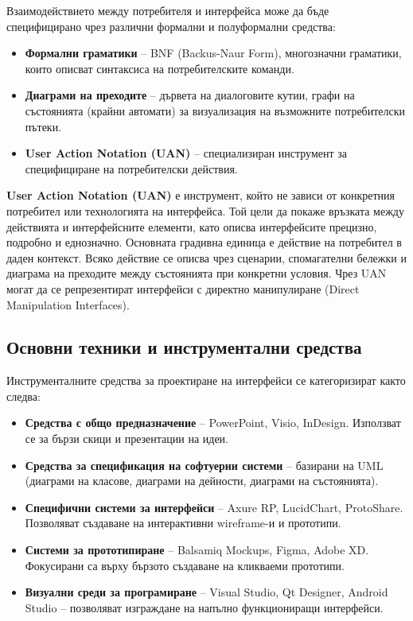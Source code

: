 \documentclass{scrartcl}
\begin{document}
\begin{FlushLeft}
Взаимодействието между потребителя и интерфейса може да бъде специфицирано чрез различни формални и полуформални средства:
\begin{itemize}
    \item \textbf{Формални граматики} – BNF (Backus-Naur Form), многозначни граматики, които описват синтаксиса на потребителските команди.
    \item \textbf{Диаграми на преходите} – дървета на диалоговите кутии, графи на състоянията (крайни автомати) за визуализация на възможните потребителски пътеки.
    \item \textbf{User Action Notation (UAN)} – специализиран инструмент за специфициране на потребителски действия.
\end{itemize}

\textbf{User Action Notation (UAN)} е инструмент, който не зависи от конкретния потребител или технологията на интерфейса. Той цели да покаже връзката между действията и интерфейсните елементи, като описва интерфейсите прецизно, подробно и еднозначно. Основната градивна единица е действие на потребител в даден контекст. Всяко действие се описва чрез сценарии, спомагателни бележки и диаграма на преходите между състоянията при конкретни условия. Чрез UAN могат да се репрезентират интерфейси с директно манипулиране (Direct Manipulation Interfaces).

\subsection{Основни техники и инструментални средства}

Инструменталните средства за проектиране на интерфейси се категоризират както следва:
\begin{itemize}
    \item \textbf{Средства с общо предназначение} – PowerPoint, Visio, InDesign. Използват се за бързи скици и презентации на идеи.
    \item \textbf{Средства за спецификация на софтуерни системи} – базирани на UML (диаграми на класове, диаграми на дейности, диаграми на състоянията).
    \item \textbf{Специфични системи за интерфейси} – Axure RP, LucidChart, ProtoShare. Позволяват създаване на интерактивни wireframe-и и прототипи.
    \item \textbf{Системи за прототипиране} – Balsamiq Mockups, Figma, Adobe XD. Фокусирани са върху бързото създаване на кликваеми прототипи.
    \item \textbf{Визуални среди за програмиране} – Visual Studio, Qt Designer, Android Studio – позволяват изграждане на напълно функциониращи интерфейси.
\end{itemize}


\end{FlushLeft}
\end{document}
